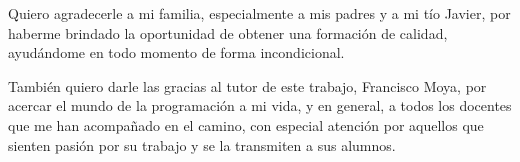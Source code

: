 \begin{agradecimientos}
\noindent Quiero agradecerle a mi familia, especialmente a mis padres y a mi tío Javier, por haberme brindado la oportunidad de obtener una formación de calidad, ayudándome en todo momento de forma incondicional.

También quiero darle las gracias al tutor de este trabajo, Francisco Moya, por acercar el mundo de la programación a mi vida, y en general, a todos los docentes que me han acompañado en el camino, con especial atención por aquellos que sienten pasión por su trabajo y se la transmiten a sus alumnos.
\end{agradecimientos}